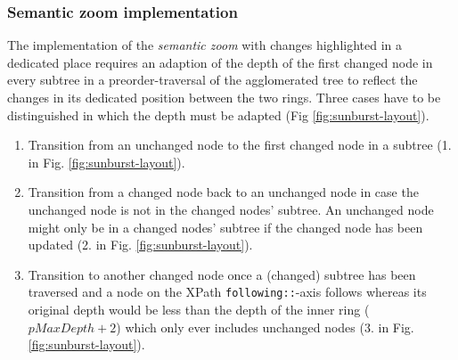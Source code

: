 
\subsubsection{Semantic zoom implementation}
The implementation of the \emph{semantic zoom} with changes highlighted in a dedicated place requires an adaption of the depth of the first changed node in every subtree in a preorder-traversal of the agglomerated tree to reflect the changes in its dedicated position between the two rings. Three cases have to be distinguished in which the depth must be adapted (Fig \ref{fig:sunburst-layout}).

\begin{enumerate}
\item Transition from an unchanged node to the first changed node in a subtree (1. in Fig. \ref{fig:sunburst-layout}). 
\item Transition from a changed node back to an unchanged node in case the unchanged node is not in the changed nodes' subtree. An unchanged node might only be in a changed nodes' subtree if the changed node has been updated (2. in Fig. \ref{fig:sunburst-layout}).
\item Transition to another changed node once a (changed) subtree has been traversed and a node on the XPath \texttt{following::}-axis follows whereas its original depth would be less than the depth of the inner ring ($pMaxDepth + 2$) which only ever includes unchanged nodes (3. in Fig. \ref{fig:sunburst-layout}).
\end{enumerate}


